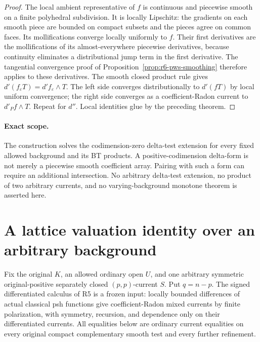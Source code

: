\documentclass[11pt,a4paper]{article}
\numberwithin{equation}{section}
\theoremstyle{definition}
\theoremstyle{remark}
\begin{document}
\begin{proof}
The local ambient representative of $f$ is continuous and
piecewise smooth on a finite polyhedral subdivision. It is
locally Lipschitz: the gradients on each smooth piece are
bounded on compact subsets and the pieces agree on common
faces. Its mollifications converge locally uniformly to $f$.
Their first derivatives are the mollifications of its
almost-everywhere piecewise derivatives, because continuity
eliminates a distributional jump term in the first derivative.
The tangential convergence proof of
Proposition~\ref{prop:r6-pws-smoothing} therefore applies to
these derivatives. The smooth closed product rule gives
$d'(f_\varepsilon T)=d'f_\varepsilon\wedge T$.
The left side converges distributionally to $d'(fT)$ by
local uniform convergence; the right side converges as a
coefficient-Radon current to $d'_Pf\wedge T$. Repeat for
$d''$. Local identities glue by the preceding theorem.
\end{proof}

\paragraph{Exact scope.}
The construction solves the codimension-zero delta-test
extension for every fixed allowed background and its BT
products. A positive-codimension delta-form is not merely a
piecewise smooth coefficient array. Pairing with such a form
can require an additional intersection. No arbitrary
delta-test extension, no product of two arbitrary currents,
and no varying-background monotone theorem is asserted here.



\section{A lattice valuation identity over an arbitrary background}
\label{sec:r6-continuous-lattice-valuation}

Fix the original $K$, an allowed ordinary open $U$, and one
arbitrary symmetric original-positive separately closed
$(p,p)$-current $S$. Put $q=n-p$. The signed differentiated
calculus of R5 is a frozen input: locally bounded differences
of actual classical psh functions give coefficient-Radon
mixed currents by finite polarization, with symmetry,
recursion, and dependence only on their differentiated
currents. All equalities below are ordinary current
equalities on every original compact complementary smooth
test and every further refinement.
\end{document}
